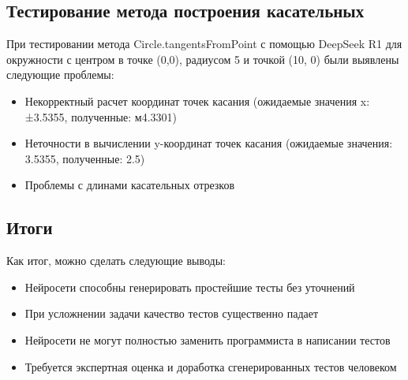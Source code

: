 \documentclass[a4paper, 12pt]{extarticle}
\begin{document}
\subsection*{Тестирование метода построения касательных}
При тестировании метода Circle.tangentsFromPoint с помощью DeepSeek R1 для окружности с центром в точке (0,0), радиусом 5 и точкой (10, 0) были выявлены следующие проблемы:
\begin{itemize}
    \item Некорректный расчет координат точек касания (ожидаемые значения x: ±3.5355, полученные: м4.3301)
    \item Неточности в вычислении y-координат точек касания (ожидаемые значения: 3.5355, полученные: 2.5)
    \item Проблемы с длинами касательных отрезков
\end{itemize}
\subsection*{Итоги}
Как итог, можно сделать следующие выводы:
\begin{itemize}
    \item Нейросети способны генерировать простейшие тесты без уточнений
    \item При усложнении задачи качество тестов существенно падает
    \item Нейросети не могут полностью заменить программиста в написании тестов
    \item Требуется экспертная оценка и доработка сгенерированных тестов человеком
\end{itemize}
\end{document}
